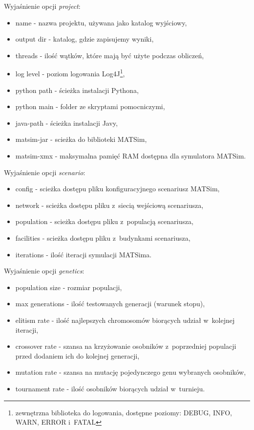 \documentclass[twoside,12pt]{report}
\begin{document}
Wyjaśnienie opcji \textit{project}:
\begin{itemize}
\item name - nazwa projektu, używana jako katalog wyjściowy,
\item output dir - katalog, gdzie zapisujemy wyniki,
\item threads - ilość wątków, które mają być użyte podczas obliczeń,
\item log level - poziom logowania Log4J\footnote{zewnętrzna biblioteka do logowania, dostępne poziomy: DEBUG, INFO, WARN, ERROR i~FATAL},
\item python path - ścieżka instalacji Pythona,
\item python main - folder ze skryptami pomocniczymi,
\item java-path - ścieżka instalacji Javy,
\item matsim-jar - scieżka do biblioteki MATSim,
\item matsim-xmx - maksymalna pamięć RAM dostępna dla symulatora MATSim.
\end{itemize}

\vspace*{15px}

Wyjaśnienie opcji \textit{scenario}:
\begin{itemize}
\item config - scieżka dostępu pliku konfiguracyjnego scenariusz MATSim,
\item network - scieżka dostępu pliku z~siecią wejściową scenariusza,
\item population - scieżka dostępu pliku z~populacją scenariusza,
\item facilities - scieżka dostępu pliku z~budynkami scenariusza,
\item iterations - ilość iteracji symulacji MATSima.
\end{itemize}

\vspace*{15px}

Wyjaśnienie opcji \textit{genetics}:
\begin{itemize}
\item population size - rozmiar populacji,
\item max generations - ilość testowanych generacji (warunek stopu),
\item elitism rate - ilość najlepszych chromosomów biorących udział w~kolejnej iteracji,
\item crossover rate - szansa na krzyżowanie osobników z~poprzedniej populacji przed dodaniem ich do kolejnej generacji,
\item mutation rate - szansa na mutację pojedynczego genu wybranych osobników,
\item tournament rate - ilość osobników biorących udział w~turnieju.
\end{itemize}
\end{document}
